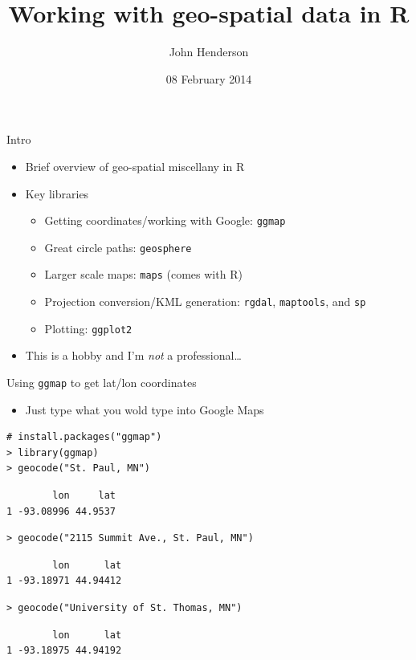\documentclass[sans,aspectratio=169,presentation,bigger,fleqn]{beamer}
\author{John Henderson}
\date{08 February 2014}
\title{Working with geo-spatial data in R}
\begin{document}
\maketitle


\begin{frame}[fragile,label=sec-1]{Intro}
 \begin{itemize}
\item Brief overview of geo-spatial miscellany in R
\item Key libraries
\begin{itemize}
\item Getting coordinates/working with Google: \texttt{ggmap}
\item Great circle paths: \texttt{geosphere}
\item Larger scale maps: \texttt{maps} (comes with R)
\item Projection conversion/KML generation: \texttt{rgdal}, \texttt{maptools}, and \texttt{sp}
\item Plotting: \texttt{ggplot2}
\end{itemize}
\end{itemize}
\pause

\begin{itemize}
\item This is a hobby and I'm \emph{not} a professional\ldots{}
\end{itemize}
\end{frame}
\begin{frame}[fragile,label=sec-2]{Using \texttt{ggmap} to get lat/lon coordinates}
 \begin{itemize}
\item Just type what you wold type into Google Maps
\end{itemize}


\scriptsize

\begin{verbatim}
# install.packages("ggmap")
> library(ggmap)
> geocode("St. Paul, MN")
\end{verbatim}

\begin{verbatim}
        lon     lat
1 -93.08996 44.9537
\end{verbatim}


\begin{verbatim}
> geocode("2115 Summit Ave., St. Paul, MN")
\end{verbatim}

\begin{verbatim}
        lon      lat
1 -93.18971 44.94412
\end{verbatim}

\begin{verbatim}
> geocode("University of St. Thomas, MN")
\end{verbatim}

\begin{verbatim}
        lon      lat
1 -93.18975 44.94192
\end{verbatim}

\normalsize
\end{frame}
\end{document}
